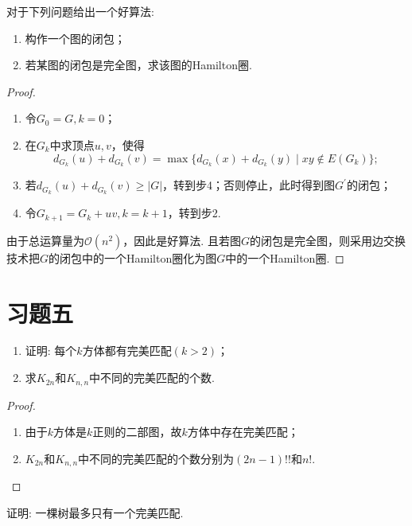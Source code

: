 \documentclass[cn,blue,normal,founder,11pt]{elegantnote}
\newcommand{\calO}{\mathcal{O}}
\begin{document}
\begin{example}
对于下列问题给出一个好算法:
\begin{enumerate}[(1)]
\item 构作一个图的闭包；
\item 若某图的闭包是完全图，求该图的Hamilton圈.
\end{enumerate}
\end{example}

\begin{proof}
\begin{enumerate}[\heiti{步}1]
\item 令\(G_0=G,k=0\)；
\item 在\(G_k\)中求顶点\(u,v\)，使得
\[d_{G_k}(u)+d_{G_k}(v)=\max\{d_{G_k}(x)+d_{G_k}(y)\mid xy\notin E(G_k)\};\]
\item 若\(d_{G_k}(u)+d_{G_k}(v)\geqslant|G|\)，转到步4；否则停止，此时得到图\(G^{\prime}\)的闭包；
\item 令\(G_{k+1}=G_k+uv,k=k+1\)，转到步2.
\end{enumerate}

由于总运算量为\(\calO(n^2)\)，因此是好算法. 且若图\(G\)的闭包是完全图，则采用边交换技术把\(G\)的闭包中的一个Hamilton圈化为图\(G\)中的一个Hamilton圈.
\end{proof}

\section{习题五}

\begin{example}\label{ex:5.1}
\begin{enumerate}[(1)]
\item 证明: 每个\(k\)方体都有完美匹配\((k>2)\)；
\item 求\(K_{2n}\)和\(K_{n,n}\)中不同的完美匹配的个数.
\end{enumerate}
\end{example}

\begin{proof}
\begin{enumerate}[(1)]
\item 由于\(k\)方体是\(k\)正则的二部图，故\(k\)方体中存在完美匹配；
\item \(K_{2n}\)和\(K_{n,n}\)中不同的完美匹配的个数分别为\((2n-1)!!\)和\(n!\).
\end{enumerate}
\end{proof}

\begin{example}
证明: 一棵树最多只有一个完美匹配.
\end{example}
\end{document}
